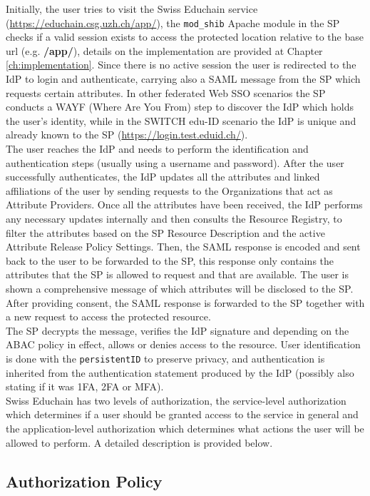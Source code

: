 Initially, the user tries to visit the Swiss Educhain service (\url{https://educhain.csg.uzh.ch/app/}), the \texttt{mod\_shib} Apache module in the SP checks if a valid session exists to access the protected location relative to the base url (e.g. \textbf{/app/}), details on the implementation are provided at Chapter \ref{ch:implementation}. Since there is no active session the user is redirected to the IdP to login and authenticate, carrying also a SAML message from the SP which requests certain attributes. In other federated Web SSO scenarios the SP conducts a WAYF (Where Are You From) step to discover the IdP which holds the user's identity, while in the SWITCH edu-ID scenario the IdP is unique and already known to the SP (\url{https://login.test.eduid.ch/}). \\
The user reaches the IdP and needs to perform the identification and authentication steps (usually using a username and password). After the user successfully authenticates, the IdP updates all the attributes and linked affiliations of the user by sending requests to the Organizations that act as Attribute Providers. Once all the attributes have been received, the IdP performs any necessary updates internally and then consults the Resource Registry, to filter the attributes based on the SP Resource Description and the active Attribute Release Policy Settings. Then, the SAML response is encoded and sent back to the user to be forwarded to the SP, this response only contains the attributes that the SP is allowed to request and that are available. The user is shown a comprehensive message of which attributes will be disclosed to the SP. After providing consent, the SAML response is forwarded to the SP together with a new request to access the protected resource. \\
The SP decrypts the message, verifies the IdP signature and depending on the ABAC policy in effect, allows or denies access to the resource. User identification is done with the \texttt{persistentID} to preserve privacy, and authentication is inherited from the authentication statement produced by the IdP (possibly also stating if it was 1FA, 2FA or MFA). \\
Swiss Educhain has two levels of authorization, the service-level authorization which determines if a user should be granted access to the service in general and the application-level authorization which determines what actions the user will be allowed to perform. A detailed description is provided below.


\subsection{Authorization Policy} \label{ssec:educhain-authorization-policy}

